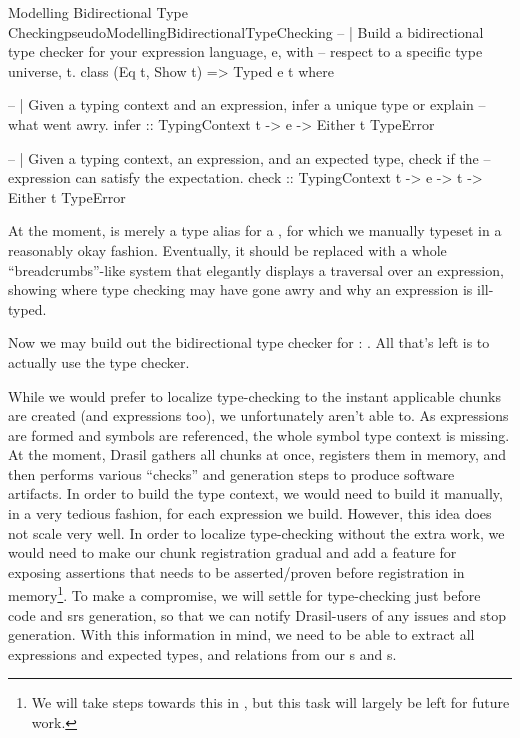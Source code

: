 \begin{pseudohaskell}{Modelling Bidirectional Type Checking}{pseudoModellingBidirectionalTypeChecking}
-- | Build a bidirectional type checker for your expression language, e, with
--   respect to a specific type universe, t.
class (Eq t, Show t) => Typed e t where
  
  -- | Given a typing context and an expression, infer a unique type or explain
  --   what went awry.
  infer :: TypingContext t -> e -> Either t TypeError

  -- | Given a typing context, an expression, and an expected type, check if the
  --   expression can satisfy the expectation.
  check :: TypingContext t -> e -> t -> Either t TypeError
\end{pseudohaskell}

At the moment,  is merely a type alias for a
, for which we manually typeset in a reasonably okay fashion.
Eventually, it should be replaced with a whole ``breadcrumbs''-like system that
elegantly displays a traversal over an expression, showing where type checking
may have gone awry and why an expression is ill-typed.

Now we may build out the bidirectional type checker for \Expr{}:
. All that's left is to actually use
the type checker.

While we would prefer to localize type-checking to the instant applicable chunks
are created (and expressions too), we unfortunately aren't able to. As
expressions are formed and symbols are referenced, the whole symbol type context
is missing. At the moment, Drasil gathers all chunks at once, registers them in
memory, and then performs various ``checks'' and generation steps to produce
software artifacts. In order to build the type context, we would need to build
it manually, in a very tedious fashion, for each expression we build. However,
this idea does not scale very well. In order to localize type-checking without
the extra work, we would need to make our chunk registration gradual and add a
feature for exposing assertions that needs to be asserted/proven before
registration in memory\footnote{We will take steps towards this in
, but this task will largely be left for future work.}.
To make a compromise, we will settle for type-checking just before code and
\acs{srs} generation, so that we can notify Drasil-users of any issues and stop
generation. With this information in mind, we need to be able to extract all
expressions and expected types, and relations from our \InstanceModel{}s and
\DataDefinition{}s.

